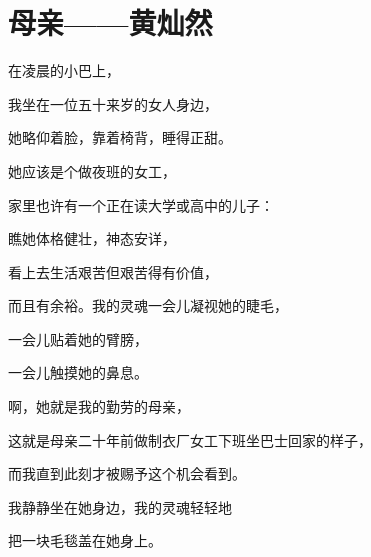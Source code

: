 \section{母亲——黄灿然}

在凌晨的小巴上，

我坐在一位五十来岁的女人身边，

她略仰着脸，靠着椅背，睡得正甜。

她应该是个做夜班的女工，

家里也许有一个正在读大学或高中的儿子：

瞧她体格健壮，神态安详，

看上去生活艰苦但艰苦得有价值，

而且有余裕。我的灵魂一会儿凝视她的睫毛，

一会儿贴着她的臂膀，

一会儿触摸她的鼻息。

啊，她就是我的勤劳的母亲，

这就是母亲二十年前做制衣厂女工下班坐巴士回家的样子，

而我直到此刻才被赐予这个机会看到。

我静静坐在她身边，我的灵魂轻轻地

把一块毛毯盖在她身上。

